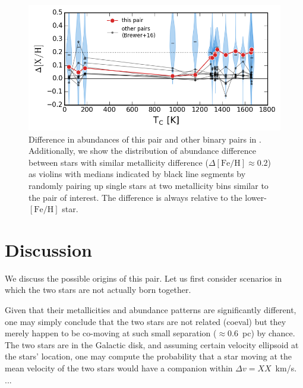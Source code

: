\documentclass[manuscript]{aastex6}
\newcommand*\elem[1]{\ensuremath{\mathrm{#1}}}
\begin{document}
\begin{figure}[htpb]
  \centering
  \includegraphics[width=0.9\linewidth]{deltaXH_Tc_violins.png}
  \caption{Difference in abundances of this pair and other binary pairs in
    \citealt{2016ApJS..225...32B}.
    Additionally, we show the distribution of abundance difference
    between stars with similar metallicity difference
    ($\Delta[\elem{Fe}/\elem{H}] \approx 0.2$)
    as violins with medians indicated by black line segments
    by randomly pairing up single stars at two metallicity bins similar to
    the pair of interest.
    The difference is always relative to the lower-$[\elem{Fe}/\elem{H}]$ star.
  }
  \label{fig:deltaXH}
\end{figure}

\section{Discussion}
\label{sec:discussion}

We discuss the possible origins of this pair.
Let us first consider scenarios in which the two stars are not actually born together.

Given that their metallicities and abundance patterns are significantly
different, one may simply conclude that the two stars are not related (coeval)
but they merely happen to be co-moving at such small separation ($\approx 0.6$~pc)
by chance.
The two stars are in the Galactic disk, and assuming certain velocity ellipsoid
at the stars' location, one may compute the probability that a star moving at
the mean velocity of the two stars would have a companion within $\Delta v = XX$~km/s.
...
\end{document}

